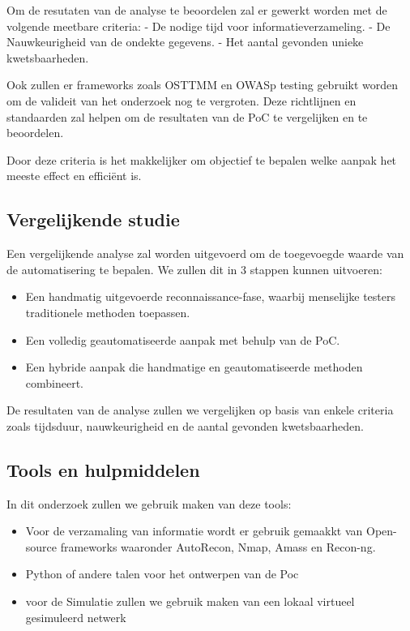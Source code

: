 Om de resutaten van de analyse te beoordelen zal er gewerkt worden met de volgende meetbare criteria:
- De nodige tijd voor informatieverzameling.
- De Nauwkeurigheid van de ondekte gegevens.
- Het aantal gevonden unieke kwetsbaarheden.

Ook zullen er frameworks zoals OSTTMM en OWASp testing gebruikt worden om de valideit van het onderzoek nog te vergroten.
Deze richtlijnen en standaarden zal helpen om de resultaten van de PoC te vergelijken en te beoordelen.

Door deze criteria is het makkelijker om objectief te bepalen welke aanpak het meeste effect en efficiënt is.



\subsection{Vergelijkende studie}

Een vergelijkende analyse zal worden uitgevoerd om de toegevoegde waarde van de automatisering te bepalen. We zullen dit in 3 stappen kunnen uitvoeren:

\begin{itemize}
    \item Een handmatig uitgevoerde reconnaissance-fase, waarbij menselijke testers traditionele methoden toepassen.
    \item Een volledig geautomatiseerde aanpak met behulp van de PoC.
    \item Een hybride aanpak die handmatige en geautomatiseerde methoden combineert.
\end{itemize}

De resultaten van de analyse zullen we vergelijken op basis van enkele criteria zoals tijdsduur, nauwkeurigheid en de aantal gevonden kwetsbaarheden.

\subsection{Tools en hulpmiddelen}

In dit onderzoek zullen we gebruik maken van deze tools: 

\begin{itemize}
    \item Voor de verzamaling van informatie wordt er gebruik gemaakkt van Open-source frameworks waaronder AutoRecon, Nmap, Amass en Recon-ng.
    \item Python of andere talen voor het ontwerpen van de Poc
    \item voor de Simulatie zullen we gebruik maken van een lokaal virtueel gesimuleerd netwerk
\end{itemize}

